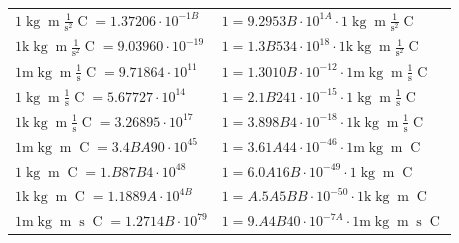 \begin{center}
\begin{longtable}{l l}
{\color{black}$1 \bm{\mathrm{ }}\operatorname{kg}{\operatorname{m}}\frac1{\operatorname{s}^2}{\operatorname{C}}{} = 1.37206\cdot10^{-1B} $}   & {\color{black}$ 1 = 9.2953B\cdot10^{1A} \cdot 1 \bm{\mathrm{ }}\operatorname{kg}{\operatorname{m}}\frac1{\operatorname{s}^2}{\operatorname{C}}{}$}  \\
{\color{gray}$1 \bm{\mathrm{ k}}\operatorname{kg}{\operatorname{m}}\frac1{\operatorname{s}^2}{\operatorname{C}}{} = 9.03960\cdot10^{-19} $}   & {\color{gray}$ 1 = 1.3B534\cdot10^{18} \cdot 1 \bm{\mathrm{ k}}\operatorname{kg}{\operatorname{m}}\frac1{\operatorname{s}^2}{\operatorname{C}}{}$}  \\
{\color{gray}$1 \bm{\mathrm{ m}}\operatorname{kg}{\operatorname{m}}\frac1{\operatorname{s}}{\operatorname{C}}{} = 9.71864\cdot10^{11} $}   & {\color{gray}$ 1 = 1.3010B\cdot10^{-12} \cdot 1 \bm{\mathrm{ m}}\operatorname{kg}{\operatorname{m}}\frac1{\operatorname{s}}{\operatorname{C}}{}$}  \\
{\color{black}$1 \bm{\mathrm{ }}\operatorname{kg}{\operatorname{m}}\frac1{\operatorname{s}}{\operatorname{C}}{} = 5.67727\cdot10^{14} $}   & {\color{black}$ 1 = 2.1B241\cdot10^{-15} \cdot 1 \bm{\mathrm{ }}\operatorname{kg}{\operatorname{m}}\frac1{\operatorname{s}}{\operatorname{C}}{}$}  \\
{\color{gray}$1 \bm{\mathrm{ k}}\operatorname{kg}{\operatorname{m}}\frac1{\operatorname{s}}{\operatorname{C}}{} = 3.26895\cdot10^{17} $}   & {\color{gray}$ 1 = 3.898B4\cdot10^{-18} \cdot 1 \bm{\mathrm{ k}}\operatorname{kg}{\operatorname{m}}\frac1{\operatorname{s}}{\operatorname{C}}{}$}  \\
{\color{gray}$1 \bm{\mathrm{ m}}\operatorname{kg}{\operatorname{m}}{}{\operatorname{C}}{} = 3.4BA90\cdot10^{45} $}   & {\color{gray}$ 1 = 3.61A44\cdot10^{-46} \cdot 1 \bm{\mathrm{ m}}\operatorname{kg}{\operatorname{m}}{}{\operatorname{C}}{}$}  \\
{\color{black}$1 \bm{\mathrm{ }}\operatorname{kg}{\operatorname{m}}{}{\operatorname{C}}{} = 1.B87B4\cdot10^{48} $}   & {\color{black}$ 1 = 6.0A16B\cdot10^{-49} \cdot 1 \bm{\mathrm{ }}\operatorname{kg}{\operatorname{m}}{}{\operatorname{C}}{}$}  \\
{\color{gray}$1 \bm{\mathrm{ k}}\operatorname{kg}{\operatorname{m}}{}{\operatorname{C}}{} = 1.1889A\cdot10^{4B} $}   & {\color{gray}$ 1 = A.5A5BB\cdot10^{-50} \cdot 1 \bm{\mathrm{ k}}\operatorname{kg}{\operatorname{m}}{}{\operatorname{C}}{}$}  \\
{\color{gray}$1 \bm{\mathrm{ m}}\operatorname{kg}{\operatorname{m}}{\operatorname{s}}{\operatorname{C}}{} = 1.2714B\cdot10^{79} $}   & {\color{gray}$ 1 = 9.A4B40\cdot10^{-7A} \cdot 1 \bm{\mathrm{ m}}\operatorname{kg}{\operatorname{m}}{\operatorname{s}}{\operatorname{C}}{}$}  \\

\end{longtable}
\end{center}

